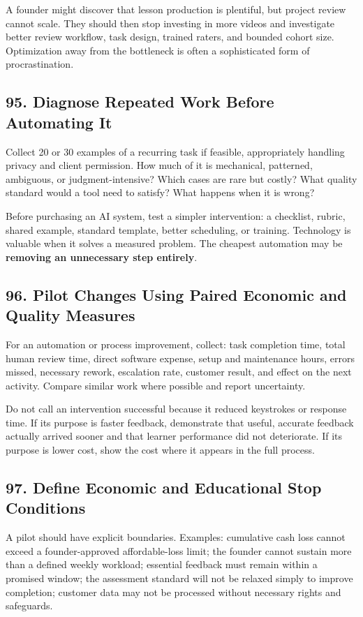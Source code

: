 A founder might discover that lesson production is plentiful, but project review cannot scale. They should then stop investing in more videos and investigate better review workflow, task design, trained raters, and bounded cohort size. Optimization away from the bottleneck is often a sophisticated form of procrastination.

\subsection*{95. Diagnose Repeated Work Before Automating It}

Collect 20 or 30 examples of a recurring task if feasible, appropriately handling privacy and client permission. How much of it is mechanical, patterned, ambiguous, or judgment-intensive? Which cases are rare but costly? What quality standard would a tool need to satisfy? What happens when it is wrong?

Before purchasing an AI system, test a simpler intervention: a checklist, rubric, shared example, standard template, better scheduling, or training. Technology is valuable when it solves a measured problem. The cheapest automation may be \textbf{removing an unnecessary step entirely}.

\subsection*{96. Pilot Changes Using Paired Economic and Quality Measures}

For an automation or process improvement, collect: task completion time, total human review time, direct software expense, setup and maintenance hours, errors missed, necessary rework, escalation rate, customer result, and effect on the next activity. Compare similar work where possible and report uncertainty.

Do not call an intervention successful because it reduced keystrokes or response time. If its purpose is faster feedback, demonstrate that useful, accurate feedback actually arrived sooner and that learner performance did not deteriorate. If its purpose is lower cost, show the cost where it appears in the full process.

\subsection*{97. Define Economic and Educational Stop Conditions}

A pilot should have explicit boundaries. Examples: cumulative cash loss cannot exceed a founder-approved affordable-loss limit; the founder cannot sustain more than a defined weekly workload; essential feedback must remain within a promised window; the assessment standard will not be relaxed simply to improve completion; customer data may not be processed without necessary rights and safeguards.

